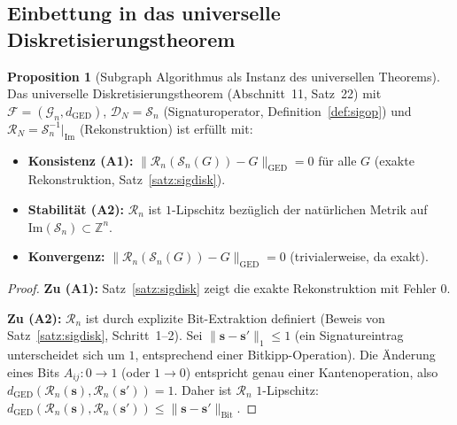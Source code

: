 ﻿\documentclass[a4paper,12pt]{article}
\theoremstyle{definition}
\newtheorem{proposition}{Proposition}
\begin{document}
\subsection{Einbettung in das universelle Diskretisierungstheorem}

\begin{proposition}[Subgraph Algorithmus als Instanz des universellen Theorems]
\label{prop:universal}
    Das universelle Diskretisierungstheorem (Abschnitt~11, Satz~22) mit
    $\mathcal{F} = (\mathcal{G}_n, d_{\mathrm{GED}})$,
    $\mathcal{D}_N = \mathcal{S}_n$ (Signaturoperator, Definition~\ref{def:sigop}) und
    $\mathcal{R}_N = \mathcal{S}_n^{-1}|_{\mathrm{Im}}$ (Rekonstruktion) ist erfüllt mit:
    \begin{itemize}
        \item \textbf{Konsistenz (A1):} $\|\mathcal{R}_n(\mathcal{S}_n(G)) - G\|_{\mathrm{GED}} = 0$
              für alle $G$ (exakte Rekonstruktion, Satz~\ref{satz:sigdisk}).
        \item \textbf{Stabilität (A2):} $\mathcal{R}_n$ ist $1$-Lipschitz bezüglich der
              natürlichen Metrik auf $\mathrm{Im}(\mathcal{S}_n) \subset \mathbb{Z}^n$.
        \item \textbf{Konvergenz:} $\|\mathcal{R}_n(\mathcal{S}_n(G)) - G\|_{\mathrm{GED}} = 0$
              (trivialerweise, da exakt).
    \end{itemize}
\end{proposition}

\begin{proof}
    \textbf{Zu (A1):} Satz~\ref{satz:sigdisk} zeigt die exakte Rekonstruktion mit Fehler 0.

    \textbf{Zu (A2):} $\mathcal{R}_n$ ist durch explizite Bit-Extraktion definiert
    (Beweis von Satz~\ref{satz:sigdisk}, Schritt~1--2). Sei
    $\|\mathbf{s} - \mathbf{s}'\|_1 \leq 1$ (ein Signatureintrag unterscheidet sich um $1$,
    entsprechend einer Bitkipp-Operation). Die Änderung eines Bits $A_{ij}: 0 \to 1$
    (oder $1 \to 0$) entspricht genau einer Kantenoperation, also
    $d_{\mathrm{GED}}(\mathcal{R}_n(\mathbf{s}), \mathcal{R}_n(\mathbf{s}')) = 1$.
    Daher ist $\mathcal{R}_n$ $1$-Lipschitz: $d_{\mathrm{GED}}(\mathcal{R}_n(\mathbf{s}),
    \mathcal{R}_n(\mathbf{s}')) \leq \|\mathbf{s} - \mathbf{s}'\|_{\mathrm{Bit}}$. \qedhere
\end{proof}
\end{document}
